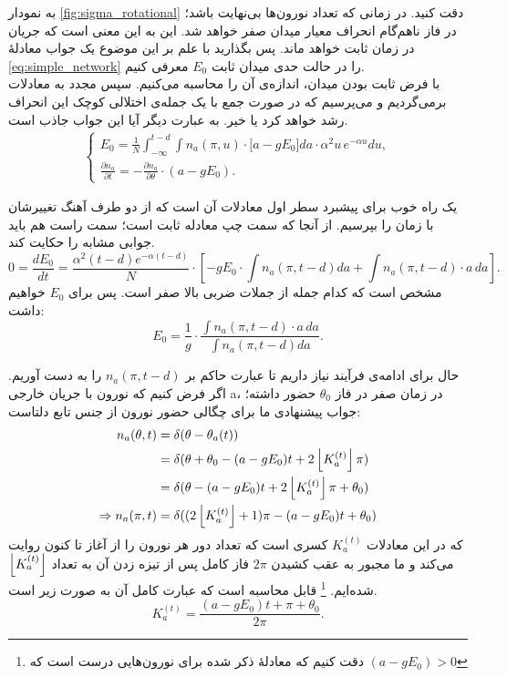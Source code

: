 به نمودار \ref{fig:sigma_rotational} دقت کنید. در زمانی که تعداد نورون‌ها بی‌نهایت باشد؛ در فاز ناهم‌گام انحراف معیار میدان صفر خواهد شد. این به این معنی است که جریان در زمان ثابت خواهد ماند. پس بگذارید با علم بر این موضوع یک جواب معادلهٔ \ref{eq:simple_network} را در حالت حدی میدان ثابت $E_0$ معرفی کنیم.\\
با فرض ثابت بودن میدان، اندازه‌ی آن را محاسبه می‌کنیم. سپس مجدد به معادلات برمی‌گردیم و می‌پرسیم که در صورت جمع با یک جمله‌ی اختلالی کوچک این انحراف رشد خواهد کرد یا خیر. به عبارت دیگر آیا این جواب جاذب است.\\
\begin{align}
	\begin{cases}
		E_0 = \frac{1}{N}\int_{- \infty}^{t - d} \int n_a(\pi,u) \cdot \big[ a - g E_0 \big] da \cdot \alpha^2 u\, e^{-\alpha u} du ,\\
		\frac{\partial n_a}{\partial t} = - \frac{\partial n_a}{\partial \theta} \cdot (a - g E_0 ) .
	\end{cases}
\end{align}

یک راه خوب برای پیشبرد سطر اول معادلات آن است که از دو طرف آهنگ تغییرشان با زمان را بپرسیم. از آنجا که سمت چپ معادله ثابت است؛ سمت راست هم باید جوابی مشابه را حکایت کند.\\
\begin{equation}
	0 = \frac{dE_0}{dt} = \frac{\alpha^2 (t-d) e^{-\alpha (t-d)}}{N} \cdot [ - gE_0 \cdot \int n_a(\pi,t-d) da + \int n_a(\pi,t-d)\cdot a\,da ].
\end{equation}
مشخص است که کدام جمله از جملات ضربی بالا صفر است. پس برای $E_0$ خواهیم داشت:
\begin{equation}
	E_0 = \frac{1}{g}\cdot \frac{\int n_a(\pi,t-d)\cdot a\,da}{\int n_a(\pi,t-d) da }.
\end{equation}

حال برای ادامه‌ی فرآیند نیاز داریم تا عبارت حاکم بر 
$n_a(\pi,t-d)$
را به دست آوریم. اگر فرض کنیم که نورون با جریان خارجی a، در زمان صفر در فاز
$\theta_0$
حضور داشته؛ جواب پیشنهادی ما برای چگالی حضور نورون از جنس تابع دلتاست:
\begin{align}
	n_a(\theta,t) &= \delta(\theta - \theta_a(t)) \\
	&= \delta(\theta + \theta_0 - (a - g E_0)t + 2 \left\lfloor K^{(t)}_a \right\rfloor\pi )\\
	&= \delta( \theta - (a - g E_0)t + 2 \left\lfloor K^{(t)}_a \right\rfloor \pi + \theta_0  )\\
	\Rightarrow n_a(\pi,t) &= \delta(  (2\left\lfloor K^{(t)}_a \right\rfloor + 1)\pi - (a - g E_0)t + \theta_0   )\\
\end{align}
که در این معادلات 
$K^{(t)}_a$
کسری است که تعداد دور هر نورون را از آغاز تا کنون روایت می‌کند و ما مجبور به عقب کشیدن 
$2\pi$
فاز کامل پس از تیزه زدن آن به تعداد 
$\left\lfloor K^{(t)}_a \right\rfloor$
شده‌ایم.
\footnote{دقت کنیم که معادلهٔ ذکر شده برای نورون‌هایی درست است که 
	$(a - g E_0) > 0 $
}
قابل محاسبه است که عبارت کامل آن به صورت زیر است.
\begin{equation}
	K^{(t)}_a = \frac{(a - gE_0)t + \pi + \theta_0}{2\pi} .
\end{equation}

